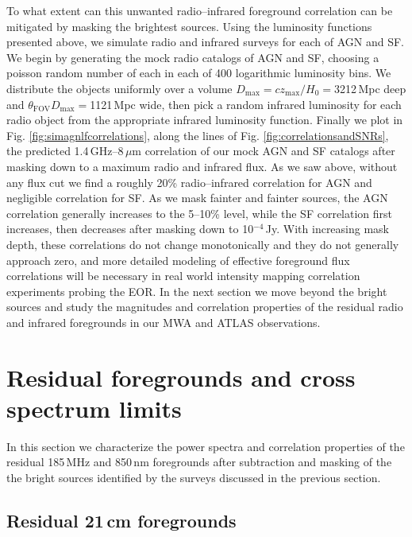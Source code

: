 \documentclass{emulateapj}
\newcommand{\maxtext}{\text{max}}
\begin{document}
To what extent can this unwanted radio--infrared foreground correlation can be mitigated by masking the brightest sources. Using the luminosity functions presented above, we simulate radio and infrared surveys for each of AGN and SF. We begin by generating the mock radio catalogs of AGN and SF, choosing a poisson random number of each in each of 400 logarithmic luminosity bins. We distribute the objects uniformly over a volume $D_\maxtext=cz_\maxtext/H_0=$3212\,Mpc deep and $\theta_{\text{FOV}}D_\maxtext=$1121\,Mpc wide, then pick a random infrared luminosity for each radio object from the appropriate infrared luminosity function. Finally we plot in Fig. \ref{fig:simagnlfcorrelations}, along the lines of Fig. \ref{fig:correlationsandSNRs}, the predicted 1.4\,GHz--8\,$\mu$m correlation of our mock AGN and SF catalogs after masking down to a maximum radio and infrared flux. As we saw above, without any flux cut we find a roughly 20\% radio--infrared correlation for AGN and negligible correlation for SF. As we mask fainter and fainter sources, the AGN correlation generally increases to the 5--10\% level, while the SF correlation first increases, then decreases after masking down to 10$^{-4}$\,Jy. With increasing mask depth, these correlations do not change monotonically and they do not generally approach zero, and more detailed modeling of effective foreground flux correlations will be necessary in real world intensity mapping correlation experiments probing the EOR. In the next section we move beyond the bright sources and study the magnitudes and correlation properties of the residual radio and infrared foregrounds in our MWA and ATLAS observations.


\section{Residual foregrounds and cross spectrum limits}

In this section we characterize the power spectra and correlation properties of the residual 185\,MHz and 850\,nm foregrounds after subtraction and masking of the the bright sources identified by the surveys discussed in the previous section.

\subsection{Residual 21\,cm foregrounds}
\label{sec:res21fgs}
\end{document}
